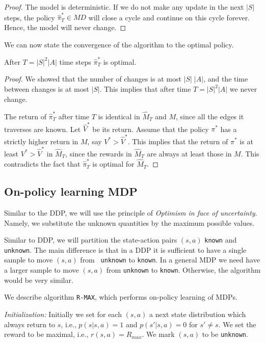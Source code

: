 \begin{proof}
The model is deterministic. If we do not make any update in the next
$|S|$ steps, the policy $\widehat{\pi}^*_T \in MD$ will close a cycle
and continue on this cycle forever. Hence, the model will never
change.
\end{proof}

We can now state the convergence of the algorithm to the optimal
policy.

\begin{theorem}
After $T=|S|^2|A|$ time steps $\widehat{\pi}^*_T$ is optimal.
\end{theorem}

\begin{proof}
We showed that the number of changes is at most $|S|\;|A|$, and the
time between changes is at most $|S|$. This implies that after time
$T=|S|^2|A|$ we never change.

The return of $\widehat{\pi}^*_T$ after time $T$ is identical in
$\widehat{M}_T$ and $M$, since all the edges it traverses are known. Let
$\widehat{V}^*$ be its return. Assume that the policy $\pi^*$ has a
strictly higher return in $M$, say $V^*>\widehat{V}^*$. This implies
that the return of $\pi^*$ is at least $V^*>\widehat{V}^*$ in
$\widehat{M}_T$, since the rewards in $\widehat{M}_T$ are always at least
those in $M$. This contradicts the fact that $\widehat{\pi}^*_T$ is
optimal for $\widehat{M}_T$.
\end{proof}


\subsection{On-policy learning MDP}

Similar to the DDP, we will use the principle of {\em Optimism in
face of uncertainty}. Namely, we substitute the unknown quantities
by the maximum possible values.

Similar to DDP, we will partition the state-action pairs $(s,a)$
{\tt known} and {\tt unknown}. The main difference is that in a DDP
it is sufficient to have a single sample to move $(s,a)$ from {\tt
unknown} to {\tt known}. In a general MDP we need have a larger
sample to move $(s,a)$ from {\tt unknown} to {\tt known}. Otherwise,
the algorithm would be very similar.

We describe algorithm {\tt R-MAX}, which performs on-policy
learning of MDPs.

{\em Initialization:} Initially we set for each $(s,a)$ a next state
distribution which always return to $s$, i.e., $p(s|s,a)=1$ and
$p(s'|s,a)=0$ for $s'\neq s$. We set the reward to be maximal, i.e.,
$r(s,a)=R_{max}$. We mark $(s,a)$ to be {\tt unknown}.

